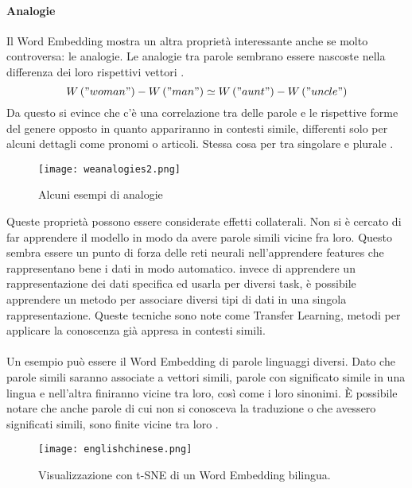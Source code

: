 \paragraph{Analogie}Il Word Embedding mostra un altra proprietà interessante anche se molto controversa: le analogie. Le analogie tra parole sembrano essere nascoste nella differenza dei loro rispettivi vettori \cite{Mikolov13}. 
\begin{equation}
  W\left ( "woman" \right ) -  W\left ( "man" \right ) \simeq W\left ( "aunt" \right ) -  W\left ( "uncle" \right )
\end{equation}
Da questo si evince che c’è una correlazione tra delle parole e le rispettive forme del genere opposto in quanto appariranno in contesti simile, differenti solo per alcuni dettagli come pronomi o articoli. Stessa cosa per tra singolare e plurale \cite{Mikolov13}.
\begin{figure}[htb]
	\centering
	\texttt{[image: weanalogies2.png]}
	\caption{Alcuni esempi di analogie}
	\label{analogies}
\end{figure}
Queste proprietà possono essere considerate effetti collaterali. Non si è cercato di far apprendere il modello in modo da avere parole simili vicine fra loro. Questo sembra essere un punto di forza delle reti neurali nell’apprendere features che rappresentano bene i dati in modo automatico. invece di apprendere un rappresentazione dei dati specifica ed usarla per diversi task, è possibile apprendere un metodo per associare diversi tipi di dati in una singola rappresentazione. Queste tecniche sono note come Transfer Learning, metodi per applicare la conoscenza già appresa in contesti simili.
\\\\
Un esempio può essere il Word Embedding di parole linguaggi diversi. Dato che parole simili saranno associate a vettori simili, parole con significato simile in una lingua e nell’altra finiranno vicine tra loro, così come i loro sinonimi. È possibile notare che anche parole di cui non si conosceva la traduzione o che avessero significati simili, sono finite vicine tra loro \cite{Zou13}.
\begin{figure}[htb]
	\centering
	\texttt{[image: englishchinese.png]}
	\caption{Visualizzazione con t-SNE di un Word Embedding bilingua. }
	\label{englishchinese}
\end{figure}


